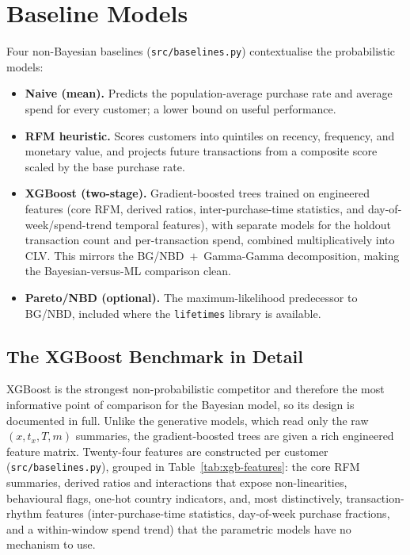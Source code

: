 \section{Baseline Models}
\label{sec:baselines}

Four non-Bayesian baselines (\texttt{src/baselines.py}) contextualise the probabilistic models:

\begin{itemize}
  \item \textbf{Naive (mean).} Predicts the population-average purchase rate and average spend for every customer; a lower bound on useful performance.
  \item \textbf{RFM heuristic.} Scores customers into quintiles on recency, frequency, and monetary value, and projects future transactions from a composite score scaled by the base purchase rate.
  \item \textbf{XGBoost (two-stage).} Gradient-boosted trees trained on engineered features (core RFM, derived ratios, inter-purchase-time statistics, and day-of-week/spend-trend temporal features), with separate models for the holdout transaction count and per-transaction spend, combined multiplicatively into CLV. This mirrors the BG/NBD~$+$~Gamma-Gamma decomposition, making the Bayesian-versus-ML comparison clean.
  \item \textbf{Pareto/NBD (optional).} The maximum-likelihood predecessor to BG/NBD, included where the \texttt{lifetimes} library is available.
\end{itemize}

\subsection{The XGBoost Benchmark in Detail}
\label{sec:xgboost}

XGBoost is the strongest non-probabilistic competitor and therefore the most informative point of comparison for the Bayesian model, so its design is documented in full. Unlike the generative models, which read only the raw $(x, t_x, T, m)$ summaries, the gradient-boosted trees are given a rich engineered feature matrix. Twenty-four features are constructed per customer (\texttt{src/baselines.py}), grouped in Table~\ref{tab:xgb-features}: the core RFM summaries, derived ratios and interactions that expose non-linearities, behavioural flags, one-hot country indicators, and, most distinctively, transaction-rhythm features (inter-purchase-time statistics, day-of-week purchase fractions, and a within-window spend trend) that the parametric models have no mechanism to use.

